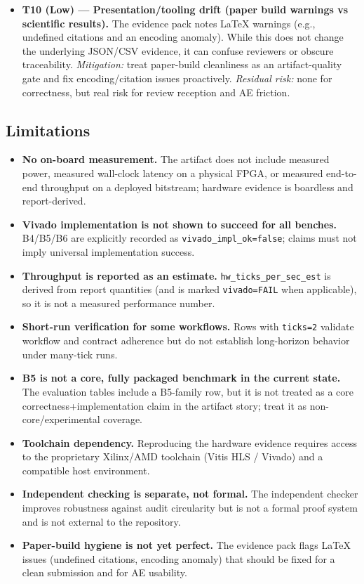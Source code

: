 \begin{itemize}
\item \textbf{T10 (Low) --- Presentation/tooling drift (paper build warnings vs scientific results).} The evidence pack notes LaTeX warnings (e.g., undefined citations and an encoding anomaly). While this does not change the underlying JSON/CSV evidence, it can confuse reviewers or obscure traceability. \textit{Mitigation:} treat paper-build cleanliness as an artifact-quality gate and fix encoding/citation issues proactively. \textit{Residual risk:} none for correctness, but real risk for review reception and AE friction.
\end{itemize}

\subsection{Limitations}

\begin{itemize}
\item \textbf{No on-board measurement.} The artifact does not include measured power, measured wall-clock latency on a physical FPGA, or measured end-to-end throughput on a deployed bitstream; hardware evidence is boardless and report-derived.

\item \textbf{Vivado implementation is not shown to succeed for all benches.} B4/B5/B6 are explicitly recorded as \texttt{vivado\_impl\_ok=false}; claims must not imply universal implementation success.

\item \textbf{Throughput is reported as an estimate.} \texttt{hw\_ticks\_per\_sec\_est} is derived from report quantities (and is marked \texttt{vivado=FAIL} when applicable), so it is not a measured performance number.

\item \textbf{Short-run verification for some workflows.} Rows with \texttt{ticks=2} validate workflow and contract adherence but do not establish long-horizon behavior under many-tick runs.

\item \textbf{B5 is not a core, fully packaged benchmark in the current state.} The evaluation tables include a B5-family row, but it is not treated as a core correctness+implementation claim in the artifact story; treat it as non-core/experimental coverage.

\item \textbf{Toolchain dependency.} Reproducing the hardware evidence requires access to the proprietary Xilinx/AMD toolchain (Vitis HLS / Vivado) and a compatible host environment.

\item \textbf{Independent checking is separate, not formal.} The independent checker improves robustness against audit circularity but is not a formal proof system and is not external to the repository.

\item \textbf{Paper-build hygiene is not yet perfect.} The evidence pack flags LaTeX issues (undefined citations, encoding anomaly) that should be fixed for a clean submission and for AE usability.
\end{itemize}
